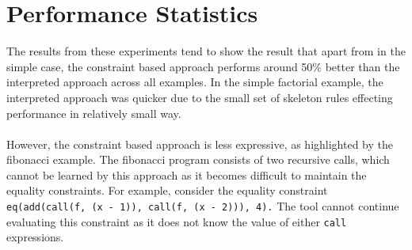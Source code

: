 \section{Performance Statistics}

The results from these experiments tend to show the result that apart from in the simple case, the constraint based approach performs around 50\% better than the interpreted approach across all examples. In the simple factorial example, the interpreted approach was quicker due to the small set of skeleton rules effecting performance in relatively small way. \\ \\
However, the constraint based approach is less expressive, as highlighted by the fibonacci example. The fibonacci program consists of two recursive calls, which cannot be learned by this approach as it becomes difficult to maintain the equality constraints. For example, consider the equality constraint \lstinline{eq(add(call(f, (x - 1)), call(f, (x - 2))), 4).} The tool cannot continue evaluating this constraint as it does not know the value of either \lstinline{call} expressions.%

